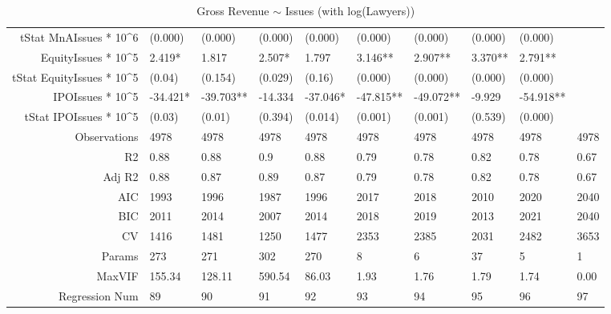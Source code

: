 \begin{table}[ht]
\begin{tabular}{rlllllllll}
  tStat MnAIssues * 10^6 & (0.000) & (0.000) & (0.000) & (0.000) & (0.000) & (0.000) & (0.000) & (0.000) &  \\ 
  EquityIssues * 10^5 & 2.419* & 1.817 & 2.507* & 1.797 & 3.146** & 2.907** & 3.370** & 2.791** &  \\ 
  tStat EquityIssues * 10^5 & (0.04) & (0.154) & (0.029) & (0.16) & (0.000) & (0.000) & (0.000) & (0.000) &  \\ 
  IPOIssues * 10^5 & -34.421* & -39.703** & -14.334 & -37.046* & -47.815** & -49.072** & -9.929 & -54.918** &  \\ 
  tStat IPOIssues * 10^5 & (0.03) & (0.01) & (0.394) & (0.014) & (0.001) & (0.001) & (0.539) & (0.000) &  \\ 
  Observations & 4978 & 4978 & 4978 & 4978 & 4978 & 4978 & 4978 & 4978 & 4978 \\ 
  R2 & 0.88 & 0.88 & 0.9 & 0.88 & 0.79 & 0.78 & 0.82 & 0.78 & 0.67 \\ 
  Adj R2 & 0.88 & 0.87 & 0.89 & 0.87 & 0.79 & 0.78 & 0.82 & 0.78 & 0.67 \\ 
  AIC & 1993 & 1996 & 1987 & 1996 & 2017 & 2018 & 2010 & 2020 & 2040 \\ 
  BIC & 2011 & 2014 & 2007 & 2014 & 2018 & 2019 & 2013 & 2021 & 2040 \\ 
  CV & 1416 & 1481 & 1250 & 1477 & 2353 & 2385 & 2031 & 2482 & 3653 \\ 
  Params & 273 & 271 & 302 & 270 & 8 & 6 & 37 & 5 & 1 \\ 
  MaxVIF & 155.34 & 128.11 & 590.54 & 86.03 & 1.93 & 1.76 & 1.79 & 1.74 & 0.00 \\ 
  Regression Num & 89 & 90 & 91 & 92 & 93 & 94 & 95 & 96 & 97 \\ 
   \hline
\end{tabular}
\caption{Gross Revenue $\sim$ Issues (with log(Lawyers))} 
\end{table}
